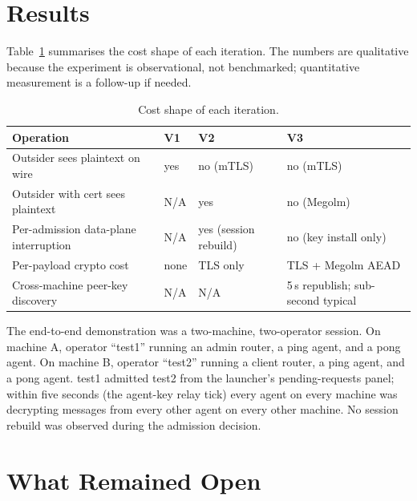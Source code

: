 \documentclass[11pt,a4paper]{article}
\begin{document}
\section{Results}

Table~\ref{tab:iter-result-shape} summarises the cost shape of
each iteration. The numbers are qualitative because the experiment
is observational, not benchmarked; quantitative measurement is a
follow-up if needed.

\begin{table}[H]
  \centering
  \small
  \begin{tabular}{|p{5.4cm}|p{1.4cm}|p{2.6cm}|p{4cm}|}
    \hline
    \rowcolor{gray!15}
    \textbf{Operation} & \textbf{V1} & \textbf{V2} & \textbf{V3} \\
    \hline
    Outsider sees plaintext on wire & yes & no (mTLS) & no (mTLS) \\
    \hline
    Outsider with cert sees plaintext & N/A & yes & no (Megolm) \\
    \hline
    Per-admission data-plane interruption & N/A & yes (session rebuild) & no (key install only) \\
    \hline
    Per-payload crypto cost & none & TLS only & TLS + Megolm AEAD \\
    \hline
    Cross-machine peer-key discovery & N/A & N/A & 5\,s republish; sub-second typical \\
    \hline
  \end{tabular}
  \caption{Cost shape of each iteration.}
  \label{tab:iter-result-shape}
\end{table}

The end-to-end demonstration was a two-machine, two-operator
session. On machine A, operator ``test1'' running an admin router,
a ping agent, and a pong agent. On machine B, operator ``test2''
running a client router, a ping agent, and a pong agent. test1
admitted test2 from the launcher's pending-requests panel; within
five seconds (the agent-key relay tick) every agent on every
machine was decrypting messages from every other agent on every
other machine. No session rebuild was observed during the
admission decision.

\section{What Remained Open}
\end{document}
